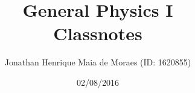\title{General Physics I \\ Classnotes}
\author{Jonathan Henrique Maia de Moraes (ID: 1620855)}
\date{02/08/2016}
\maketitle
